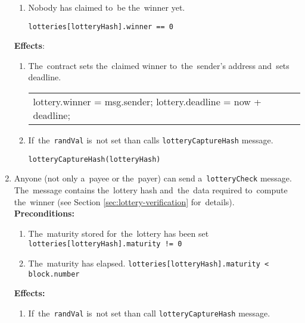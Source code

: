 \documentclass[a4paper]{article}
\begin{document}
\begin{enumerate}
\begin{enumerate}
                \item Nobody has claimed to~be the~winner yet.
                    \begin{center}
                        \texttt{lotteries[lotteryHash].winner == 0}
                    \end{center}
            \end{enumerate}
            \textbf{Effects}:
            \begin{enumerate}
                \item The~contract sets the~claimed winner to~the~sender's address and~sets deadline.
                    \begin{center}
                        \begin{tabular}{l}
                		    lottery.winner = msg.sender;
                            lottery.deadline = now + deadline;
                        \end{tabular}
                    \end{center}
                \item If~the~\texttt{randVal} is~not set than calls \texttt{lotteryCaptureHash} message.
                    \begin{center}
                        \texttt{lotteryCaptureHash(lotteryHash)}
                    \end{center}
            \end{enumerate}
        \item Anyone (not only a~payee or the~payer) can send a~\texttt{lotteryCheck} message. The~message contains
            the~lottery hash and~the~data required to~compute the~winner (see Section \ref{sec:lottery-verification}
            for~details).\\
            \textbf{Preconditions:}
            \begin{enumerate}
                \item The~maturity stored for~the~lottery has been set
                    \texttt{lotteries[lotteryHash].maturity != 0}
                \item The~maturity has elapsed.
	                \texttt{lotteries[lotteryHash].maturity < block.number}
	        \end{enumerate}
	        \textbf{Effects:}
	        \begin{enumerate}
                \item If~the~\texttt{randVal} is~not set than call \texttt{lotteryCaptureHash} message.
                    \begin{center}

\end{center}
\end{enumerate}
\end{enumerate}
\end{document}

